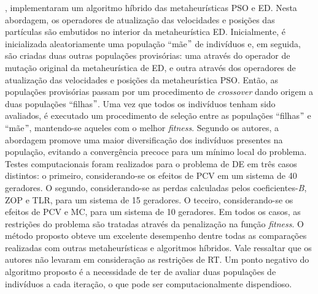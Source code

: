 \documentclass[
	12pt,				%
	openany,			%
	twoside,			%
	a4paper,			%
	chapter=TITLE,		%
	section=Title,		%
	subsection=Title,	%
	subsubsection=Title,%
	english,			%
	french,				%
	spanish,			%
	brazil			%
	]{abntex2}
\begin{document}
\begin{ERRATA}
, implementaram um algoritmo híbrido das metaheurísticas PSO e ED. Nesta abordagem, os operadores de atualização das velocidades e posições das partículas são embutidos no interior da metaheurística ED. Inicialmente, é inicializada aleatoriamente uma população ``mãe$"$  de indivíduos e, em seguida, são criadas duas outras populações provisórias: uma através do operador de mutação original da metaheurística de ED, e outra através dos operadores de atualização das velocidades e posições da metaheurística PSO. Então, as populações provisórias passam por um procedimento de \emph{crossover} dando origem a duas populações ``filhas$"$. Uma vez que todos os indivíduos tenham sido avaliados, é executado um procedimento de seleção entre as populações ``filhas$"$ e ``mãe$"$, mantendo-se aqueles com o melhor \emph{fitness}. Segundo os autores, a abordagem promove uma maior diversificação dos indivíduos presentes na população, evitando a convergência precoce para um mínimo local do problema. Testes computacionais foram realizados para o problema de DE em três casos distintos: o primeiro, considerando-se os efeitos de PCV em um sistema de 40 geradores. O segundo, considerando-se as perdas calculadas pelos coeficientes-\emph{B}, ZOP e TLR, para um sistema de 15 geradores. O teceiro, considerando-se os efeitos de PCV e MC, para um sistema de 10 geradores. Em todos os casos, as restrições do problema são tratadas através da penalização na função \emph{fitness}. O método proposto obteve um excelente desempenho dentre todas as comparações realizadas com outras metaheurísticas e algoritmos híbridos. Vale ressaltar que os autores não levaram em consideração as restrições de RT. Um ponto negativo do algoritmo proposto é a necessidade de ter de avaliar duas populações de indivíduos a cada iteração, o que pode ser computacionalmente dispendioso.



\end{ERRATA}
\end{document}
